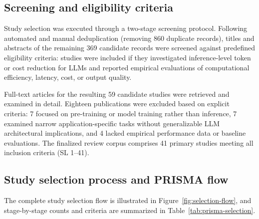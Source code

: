 \IfFileExists{jair.cls}{\documentclass{jair}}{\documentclass[manuscript,nonacm,screen]{acmart}}
\begin{document}
\subsection{Screening and eligibility criteria}

Study selection was executed through a two-stage screening protocol. Following automated and manual deduplication (removing 860 duplicate records), titles and abstracts of the remaining 369 candidate records were screened against predefined eligibility criteria: studies were included if they investigated inference-level token or cost reduction for LLMs and reported empirical evaluations of computational efficiency, latency, cost, or output quality. 

Full-text articles for the resulting 59 candidate studies were retrieved and examined in detail. Eighteen publications were excluded based on explicit criteria: 7 focused on pre-training or model training rather than inference, 7 examined narrow application-specific tasks without generalizable LLM architectural implications, and 4 lacked empirical performance data or baseline evaluations. The finalized review corpus comprises 41 primary studies meeting all inclusion criteria (SL 1--41).

\subsection{Study selection process and PRISMA flow}

The complete study selection flow is illustrated in Figure~\ref{fig:selection-flow}, and stage-by-stage counts and criteria are summarized in Table~\ref{tab:prisma-selection}.
\end{document}
